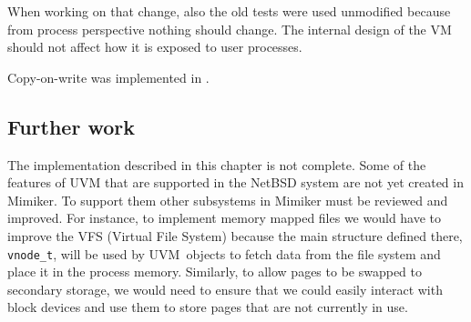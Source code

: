 
When working on that change, also the old tests were used unmodified because from process perspective nothing should change.
The internal design of the VM should not affect how it is exposed to user processes.


Copy-on-write was implemented in .

\subsection{Further work}

The implementation described in this chapter is not complete.
Some of the features of UVM that are supported in the NetBSD system are not yet created in Mimiker.
To support them other subsystems in Mimiker must be reviewed and improved.
For instance, to implement memory mapped files we would have to improve the VFS (Virtual File System) because the main structure defined there,
\texttt{vnode_t}, will be used by UVM~objects to fetch data from the file system and place it in the process memory.
Similarly, to allow pages to be swapped to secondary storage,
we would need to ensure that we could easily interact with block devices and use them to store pages that are not currently in use.
